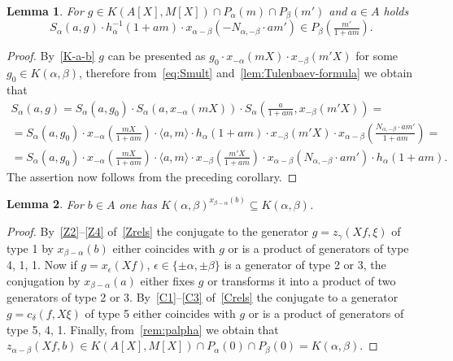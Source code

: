 \documentclass[oneside, 8pt]{amsart}
\newtheorem{lemma}{Lemma}
\theoremstyle{remark}
\theoremstyle{definition}
\numberwithin{lemma}{section}
\numberwithin{prop}{section}
\numberwithin{corollary}{section}
\numberwithin{externaltheorem}{section}
\numberwithin{equation}{section}
\begin{document}
\begin{lemma} \label{SR:sharp} For $g \in K(A[X], M[X]) \cap P_\alpha(m) \cap P_\beta(m')$ and $a \in A$ holds \[S_\alpha(a, g)\cdot  h^{-1}_\alpha(1 + am) \cdot x_{\alpha-\beta}(-N_{\alpha,-\beta}\cdot am') \in P_\beta\left(\tfrac{m'}{1 + am}\right). \] \end{lemma}
\begin{proof} By~\cref{K-a-b} $g$ can be presented as $ g_0 \cdot x_{-\alpha}(mX) \cdot x_{-\beta}(m'X)$ for some $g_0\in K(\alpha, \beta)$, therefore from~\eqref{eq:Smult} and~\cref{lem:Tulenbaev-formula} we obtain that \begin{multline} \nonumber S_\alpha(a, g) = S_\alpha(a, g_0) \cdot S_\alpha(a, x_{-\alpha}(mX)) \cdot S_\alpha\left(\tfrac{a}{1+am}, x_{-\beta}(m'X)\right) = \\ = S_\alpha(a, g_0) \cdot x_{-\alpha}\left(\tfrac{mX}{1+am}\right) \cdot \langle a, m \rangle \cdot h_\alpha(1+am) \cdot x_{-\beta}(m'X) \cdot x_{\alpha-\beta}\left(\tfrac{N_{\alpha, -\beta} \cdot am'}{1+am}\right) = \\ = S_\alpha(a, g_0) \cdot x_{-\alpha}\left(\tfrac{mX}{1+am}\right) \cdot \langle a, m \rangle \cdot  x_{-\beta}\left(\tfrac{m'X}{1+am}\right) \cdot x_{\alpha-\beta}\left(N_{\alpha, -\beta} \cdot am'\right) \cdot h_\alpha(1+am). \end{multline}
The assertion now follows from the preceding corollary.
\end{proof}
  
\begin{lemma} \label{conj-K-a-b} For $b \in A$ one has $K(\alpha, \beta)^{x_{\beta - \alpha}(b)} \subseteq K(\alpha, \beta)$. \end{lemma}
\begin{proof} By~\eqref{Z2}--\eqref{Z4} of~\cref{Zrels} the conjugate to the generator $g=z_\gamma(Xf, \xi)$ of type 1 by $x_{\beta-\alpha}(b)$ either coincides with $g$ or is a product of generators of type 4, 1, 1. Now if $g = x_\epsilon(Xf)$, $\epsilon \in \{\pm \alpha, \pm \beta\}$ is a generator of type 2 or 3, the conjugation by $x_{\beta-\alpha}(a)$ either fixes $g$ or transforms it into a product of two generators of type 2 or 3. By~\eqref{C1}--\eqref{C3} of~\cref{Crels} the conjugate to a generator $g = c_\delta(f, X\xi)$ of type 5 either coincides with $g$ or is a product of generators of type 5, 4, 1. Finally, from~\cref{rem:palpha} we obtain that $z_{\alpha-\beta}(Xf, b) \in K(A[X], M[X]) \cap P_\alpha(0) \cap P_{\beta}(0) = K(\alpha, \beta)$. \end{proof} 
\end{document}
